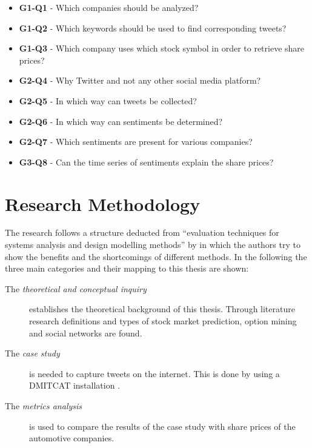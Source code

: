 \begin{itemize}
    \item \textbf{G1-Q1} - Which companies should be analyzed?
    \item \textbf{G1-Q2} - Which keywords should be used to find corresponding tweets?
    \item \textbf{G1-Q3} - Which company uses which stock symbol in order to retrieve share prices?
    \item \textbf{G2-Q4} - Why Twitter and not any other social media platform?
    \item \textbf{G2-Q5} - In which way can tweets be collected?
    \item \textbf{G2-Q6} - In which way can sentiments be determined?
    \item \textbf{G2-Q7} - Which sentiments are present for various companies?
	\item \textbf{G3-Q8} - Can the time series of sentiments explain the share prices?
\end{itemize}

\section{Research Methodology}
\label{s:introduction-researchmethodology}

The research follows a structure deducted from ``evaluation techniques for systems analysis and design modelling methods'' by \citet{Siau2011} in which the authors try to show the benefits and the shortcomings of different methods.
In the following the three main categories and their mapping to this thesis are shown:

\begin{description}
	\item[The \emph{theoretical and conceptual inquiry}]
		establishes the theoretical background of this thesis.
		Through literature research definitions and types of stock market prediction, option mining and social networks are found.
	
	\item[The \emph{case study}]
		is needed to capture tweets on the internet.
		This is done by using a \ac{DMITCAT} installation
		\citep{Borra2014}.
	
	\item[The \emph{metrics analysis}]
		is used to compare the results of the case study with share prices of the automotive companies.
\end{description}

